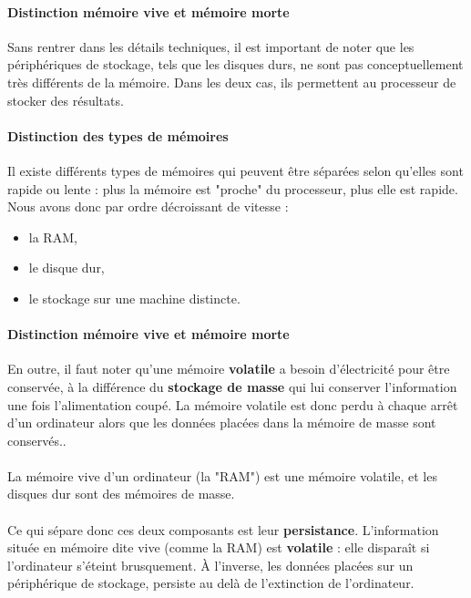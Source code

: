 {  \paragraph{Distinction mémoire vive et mémoire morte} Sans rentrer dans les détails techniques, il
  est important de noter que les périphériques de stockage, tels que les disques durs, ne sont pas 
  conceptuellement très différents de la mémoire. Dans les deux cas, ils permettent au processeur de 
  stocker des résultats.

  \paragraph{Distinction des types de mémoires} Il existe différents types de mémoires qui peuvent 
  être séparées selon qu'elles sont rapide ou lente : plus la mémoire est "proche" du processeur, 
  plus elle est rapide. Nous avons donc par ordre décroissant de vitesse : 

  \begin{itemize}
    \item la RAM,
    \item le disque dur,
    \item le stockage sur une machine distincte.
  \end{itemize}

  \paragraph{Distinction mémoire vive et mémoire morte}  En outre, il faut noter qu'une mémoire 
  \textbf{volatile} a besoin d'électricité pour être conservée, à la différence du \textbf{stockage 
  de masse} qui lui conserver l'information une fois l'alimentation coupé. La mémoire volatile est 
 donc perdu à chaque arrêt d'un ordinateur alors que les données placées dans la mémoire de masse 
 sont conservés.. 

  \paragraph{} La mémoire vive d'un ordinateur (la "RAM") est une mémoire volatile, et les disques 
  dur sont des mémoires de masse.

  \paragraph{} Ce qui sépare donc ces deux composants est leur \textbf{persistance}. L'information
  située en mémoire dite vive (comme la RAM) est \textbf{volatile} : elle disparaît si l'ordinateur s'éteint brusquement. À
  l'inverse, les données placées sur un périphérique de stockage, persiste au delà de l'extinction de
  l'ordinateur.
}

